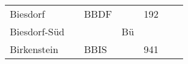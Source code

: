 \begin{longtable}{lllllll}
\begin{comment}
\nbus N26                                                                                                                                        \\
\hline
Biesdorf                      &                 & BBDF            &                 &
\sfuenf{} \bus{} 192                                                                                                                             &
\sfuenf{}                                                                                                                                        &
                                                                                                                                                 \\
\hline
Biesdorf-Süd                  &                 &                 & Bü              &
\ufuenf{}                                                                                                                                        &
\ufuenf{}                                                                                                                                        &
                                                                                                                                                 \\
\hline
Birkenstein                   &                 & BBIS            &                 &
\sfuenf{} 941                                                                                                                                    &

\end{comment}
\end{longtable}
